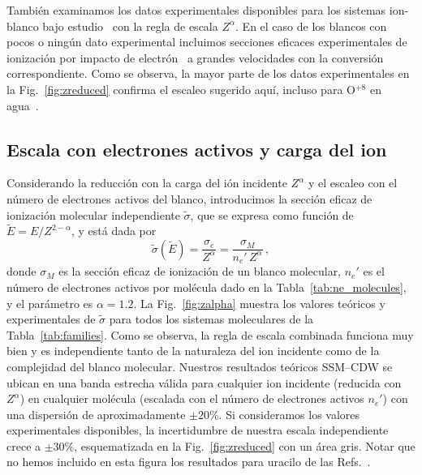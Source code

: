 También examinamos los datos experimentales disponibles para los sistemas
ion-blanco bajo estudio~\cite{Iriki:11,Sens:20,Bhattacharjee:19,itoh2013,
wolff2014,wang2016,agnihotri2012,agnihotri2013,Luna2007,Bolorizadeh86,
H_Rudd85,He_Rudd85,toburen80,Ohsawa05,Bhattacharjee:17,DalCappello:09,
Bhattacharjee:16} con la regla de escala $Z^\alpha$. En el caso de los 
blancos con pocos o ningún dato experimental incluimos secciones eficaces 
experimentales de ionización por impacto de electrón~\cite{Rahman:16,
bug2017,wolf2019,fuss2009} a grandes velocidades con la conversión 
correspondiente. Como se observa, la mayor parte de los datos 
experimentales en la Fig.~\ref{fig:zreduced} confirma el escaleo sugerido 
aquí, incluso para O$^{+8}$ en agua~\cite{Bhattacharjee:16}. 

\subsection{Escala con electrones activos y carga del ion}
\label{sec:nez_scaling}

Considerando la reducción con la carga del ión incidente $Z^\alpha$ y el 
escaleo con el número de electrones activos del blanco, introducimos 
la sección eficaz de ionización molecular independiente $\tilde{\sigma}$, 
que se expresa como función de $\tilde{E}=E/Z^{2-\alpha}$, y está dada por
\begin{equation}
 \tilde{\sigma}\left(\tilde{E}\right)=\frac{\sigma_e}{Z^{\alpha}}
 =\frac{\sigma_M}{n_e'\,Z^{\alpha}}\,,
\label{eq:u-scaling}
\end{equation}
donde $\sigma_M$ es la sección eficaz de ionización de un blanco 
molecular, $n_e'$ es el número de electrones activos por molécula dado
en la Tabla~\ref{tab:ne_molecules}, y el parámetro es $\alpha=1.2$. La 
Fig.~\ref{fig:zalpha} muestra los valores teóricos y experimentales de 
$\tilde{\sigma}$ para todos los sistemas moleculares de la 
Tabla~\ref{tab:families}. Como se observa, la regla de escala combinada 
funciona muy bien y es independiente tanto de la naturaleza del ion 
incidente como de la complejidad del blanco molecular. Nuestros 
resultados teóricos SSM--CDW se ubican en una banda estrecha válida para 
cualquier ion incidente (reducida con $Z^\alpha$) en cualquier molécula
(escalada con el número de electrones activos $n_e'$) con una dispersión 
de aproximadamente $\pm 20\%$. Si consideramos los valores experimentales
disponibles, la incertidumbre de nuestra escala independiente crece a 
$\pm 30\%$, esquematizada en la Fig.~\ref{fig:zreduced} con un área gris. 
Notar que no hemos incluido en esta figura los resultados para uracilo de 
las Refs.~\cite{agnihotri2012,agnihotri2013}. 

